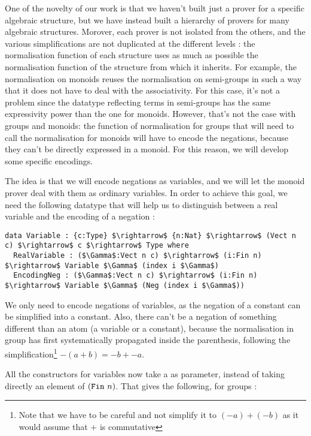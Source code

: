 One of the novelty of our work is that we haven't built just a prover for a specific algebraic structure, but we have instead built a hierarchy of provers for many algebraic structures. Morover, each prover is not isolated from the others, and the various simplifications are not duplicated at the different levels : the normalisation function of each structure uses as much as possible the normalisation function of the structure from which it inherits. For example, the normalisation on monoids reuses the normalisation on semi-groups in such a way that it does not have to deal with the associativity. For this case, it's not a problem since the datatype reflecting terms in semi-groups has the same expressivity power than the one for monoids. However, that's not the case with groups and monoids: the function of normalisation for groups that will need to call the normalisation for monoids will have to encode the negations, because they can't be directly expressed in a monoid. For this reason, we will develop some specific encodings.

The idea is that we will encode negations as variables, and we will let the monoid prover deal with them as ordinary variables. In order to achieve this goal, we need the following datatype that will help us to distinguish between a real variable and the encoding of a negation :

\begin{lstlisting}
data Variable : {c:Type} $\rightarrow$ {n:Nat} $\rightarrow$ (Vect n c) $\rightarrow$ c $\rightarrow$ Type where
  RealVariable : ($\Gamma$:Vect n c) $\rightarrow$ (i:Fin n) $\rightarrow$ Variable $\Gamma$ (index i $\Gamma$)
  EncodingNeg : ($\Gamma$:Vect n c) $\rightarrow$ (i:Fin n) $\rightarrow$ Variable $\Gamma$ (Neg (index i $\Gamma$))
\end{lstlisting}

We only need to encode negations of variables, as the negation of a constant can be simplified into a constant. Also, there can't be a negation of something different than an atom (a variable or a constant), because the normalisation in group has first systematically propagated  inside the parenthesis, following the simplification\footnote{Note that we have to be careful and not simplify it to $(-a) + (-b)$ as it would assume that $+$ is commutative} $-(a+b) = -b + -a$.

All the constructors for variables now take a  as parameter, instead of taking directly an element of $(\code{Fin}\ n)$. That gives the following, for groups :

